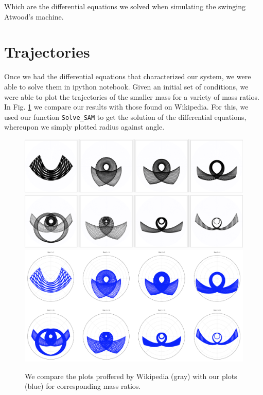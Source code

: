 \documentclass{article}
\begin{document}
Which are the differential equations we solved when simulating the swinging Atwood's machine.

\section*{Trajectories}

Once we had the differential equations that characterized our system, we were able to solve them in ipython notebook.  Given an initial set of conditions, we were able to plot the trajectories of the smaller mass for a variety of mass ratios.  In Fig. \ref{comparison} we compare our results with those found on Wikipedia.  For this, we used our function \texttt{Solve\_SAM} to get the solution of the differential equations, whereupon we simply plotted radius against angle.

\begin{figure}
\centering
\includegraphics[width=\textwidth]{topper}
\includegraphics[width=\textwidth]{bottom}
\includegraphics[width=\textwidth]{us}
\caption{We compare the plots proffered by Wikipedia (gray) with our plots (blue) for corresponding mass ratios.}
\label{comparison}
\end{figure}
\end{document}
